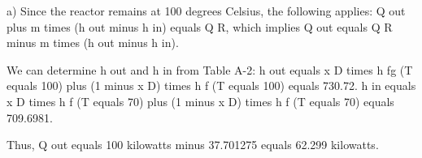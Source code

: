 a) Since the reactor remains at 100 degrees Celsius, the following applies:  
Q out plus m times (h out minus h in) equals Q R, which implies Q out equals Q R minus m times (h out minus h in).  

We can determine h out and h in from Table A-2:  
h out equals x D times h fg (T equals 100) plus (1 minus x D) times h f (T equals 100) equals 730.72.  
h in equals x D times h f (T equals 70) plus (1 minus x D) times h f (T equals 70) equals 709.6981.  

Thus, Q out equals 100 kilowatts minus 37.701275 equals 62.299 kilowatts.